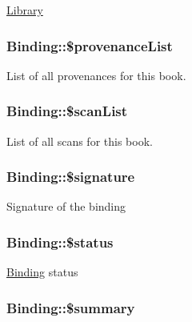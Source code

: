 \hyperlink{classLibrary}{Library} \hypertarget{classBinding_a9f4c618edbd6df5e1972aae7350e37d4}{
\subsubsection[{\$provenanceList}]{\setlength{\rightskip}{0pt plus 5cm}Binding::\$provenanceList}}
\label{classBinding_a9f4c618edbd6df5e1972aae7350e37d4}
List of all provenances for this book. \hypertarget{classBinding_a1ba6844e15978a1136a50632f30e29b6}{
\subsubsection[{\$scanList}]{\setlength{\rightskip}{0pt plus 5cm}Binding::\$scanList}}
\label{classBinding_a1ba6844e15978a1136a50632f30e29b6}
List of all scans for this book. \hypertarget{classBinding_a508680736126fbd926d7f6ba9aeed585}{
\subsubsection[{\$signature}]{\setlength{\rightskip}{0pt plus 5cm}Binding::\$signature}}
\label{classBinding_a508680736126fbd926d7f6ba9aeed585}
Signature of the binding \hypertarget{classBinding_a1320ef2d72d40ce811c675afc602929a}{
\subsubsection[{\$status}]{\setlength{\rightskip}{0pt plus 5cm}Binding::\$status}}
\label{classBinding_a1320ef2d72d40ce811c675afc602929a}
\hyperlink{classBinding}{Binding} status \hypertarget{classBinding_ae960edd7ba2a427c3853936f0e1a380e}{
\subsubsection[{\$summary}]{\setlength{\rightskip}{0pt plus 5cm}Binding::\$summary}}
